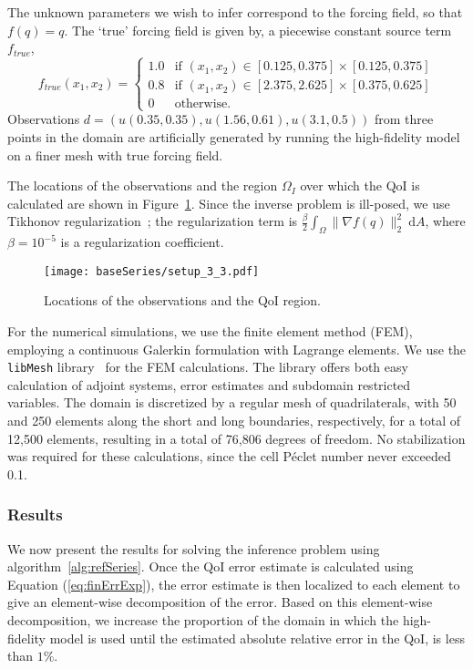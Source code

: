 The unknown parameters we wish to infer correspond to the forcing field, so that $f(q)=q$. The `true' forcing field is given by,
a piecewise constant source term $f_{true}$,
%
\begin{equation}
f_{true}(x_1,x_2)=
\begin{cases}
1.0 & \textrm{if }(x_1,x_2)\in[0.125,0.375]\times[0.125,0.375] \\
0.8 & \textrm{if }(x_1,x_2)\in[2.375,2.625]\times[0.375,0.625] \\
0 & \textrm{otherwise}.
\end{cases}
\end{equation}
%
Observations $d=(u(0.35,0.35),u(1.56,0.61),u(3.1,0.5))$ from three points in the domain are artificially generated by running the high-fidelity model on a finer mesh with true forcing field. 

The locations of the observations and the region $\Omega_I$ over which the QoI is calculated are shown in Figure~\ref{fig:baseSetup}. Since the inverse problem is ill-posed, we use Tikhonov regularization~\cite{EngHanNeu00}; the regularization term is $\frac{\beta}{2}\int_\Omega \|\nabla f(q)\|_2^2\:\textrm{d}A$, where $\beta=10^{-5}$ is a regularization coefficient.
%
\begin{figure}[h]
\centering
\texttt{[image: baseSeries/setup\_3\_3.pdf]}
\caption{Locations of the observations and the QoI region.}
\label{fig:baseSetup}
\end{figure}
%
For the numerical simulations, we use the finite element method (FEM), employing a continuous Galerkin formulation with Lagrange elements. We use the \texttt{libMesh} library~\cite{libMeshPaper} for the FEM calculations. The library offers both easy calculation of adjoint systems, error estimates and subdomain restricted variables. The domain is discretized by a regular mesh of quadrilaterals, with 50 and 250 elements along the short and long boundaries, respectively, for a total of 12,500 elements, resulting in a total of 76,806 degrees of freedom. No stabilization was required for these calculations, since the cell P\'{e}clet number never exceeded 0.1.
%
\subsubsection{Results} \label{sec:cdvcdrBaseRef} 
%
We now present the results for solving the inference problem using algorithm~\ref{alg:refSeries}. Once the QoI error estimate is calculated using Equation (\ref{eq:finErrExp}), the error estimate is then localized to each element to give an element-wise decomposition of the error. Based on this element-wise decomposition, we increase the proportion of the domain in which the high-fidelity model is used until the estimated absolute relative error in the QoI, is less than $1\%$. 


